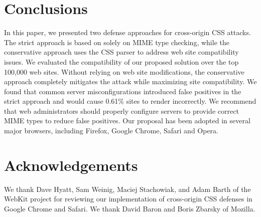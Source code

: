 \documentclass{acm_proc_article-sp}
\begin{document}
\section{Conclusions} \label{sec:conclusion}
In this paper, we presented two defense approaches for cross-origin CSS attacks. The strict approach is based on solely on MIME type
checking, while the conservative approach uses the CSS parser to
address web site compatibility issues. We evaluated the compatibility of our
proposed solution over the top 100,000 web sites. Without relying on web site
modifications, the conservative approach completely mitigates the attack while
maximizing site compatibility. We found that common server misconfigurations
introduced false positives in the strict approach and would cause 0.61\%
sites to render incorrectly. We recommend that web administrators should
properly configure servers to provide correct MIME types to reduce false
positives. Our proposal has been adopted in several major browsers, including
Firefox, Google Chrome, Safari and Opera.

\section*{Acknowledgements}

We thank Dave Hyatt, Sam Weinig, Maciej Stachowiak, and Adam Barth of the
WebKit project for reviewing our implementation of cross-origin CSS defenses in Google Chrome and Safari. We thank David Baron and Boris Zbarsky of Mozilla.



\end{document}
